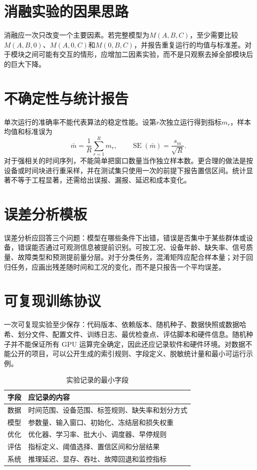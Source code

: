 \section{消融实验的因果思路}
消融应一次只改变一个主要因素。若完整模型为$M(A,B,C)$，至少需要比较$M(A,B,0)$、$M(A,0,C)$和$M(0,B,C)$，并报告重复运行的均值与标准差。对于模块之间可能有交互的情形，应增加二因素实验，而不是只观察去掉全部模块后的巨大下降。

\section{不确定性与统计报告}
单次运行的准确率不能代表算法的稳定性能。设第$r$次独立运行得到指标$m_r$，样本均值和标准误为
\begin{equation}
 \bar m=\frac1R\sum_{r=1}^R m_r,
 \qquad
 \operatorname{SE}(\bar m)=\frac{s_m}{\sqrt R}.
\end{equation}
对于强相关的时间序列，不能简单把窗口数量当作独立样本数。更合理的做法是按设备或时间块进行重采样，并在测试集只使用一次的前提下报告置信区间。统计显著不等于工程显著，还需给出误报、漏报、延迟和成本变化。

\section{误差分析模板}
误差分析应回答三个问题：模型在哪些条件下出错，错误是否集中于某些群体或设备，错误能否通过可观测信息被提前识别。可按工况、设备年龄、缺失率、信号质量、故障类型和预测提前量分层。对于分类任务，混淆矩阵应配合样本量；对于回归任务，应画出残差随时间和工况的变化，而不是只报告一个平均误差。

\section{可复现训练协议}
一次可复现实验至少保存：代码版本、依赖版本、随机种子、数据快照或数据哈希、划分文件、配置文件、训练日志、最优检查点、评估脚本和硬件信息。随机种子并不能保证所有 GPU 运算完全确定，因此还应记录软件和硬件环境。对数据不能公开的项目，可以公开生成的索引规则、字段定义、脱敏统计量和最小可运行示例。

\begin{table}[htbp]
\centering
\caption{实验记录的最小字段}
\begin{tabular}{p{}p{}}
\toprule
字段 & 应记录的内容\\
\midrule
数据 & 时间范围、设备范围、标签规则、缺失率和划分方式\\
模型 & 参数量、输入窗口、初始化、冻结层和损失权重\\
优化 & 优化器、学习率、批大小、调度器、早停规则\\
评估 & 指标定义、阈值选择、置信区间和分层结果\\
系统 & 推理延迟、显存、吞吐、故障回退和监控指标\\
\bottomrule
\end{tabular}
\end{table}


